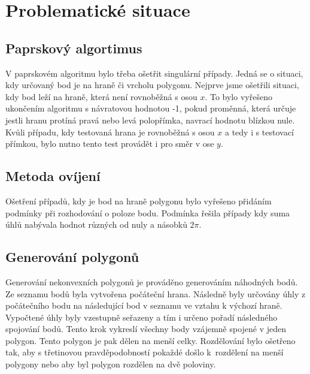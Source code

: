 \documentclass{article}
\begin{document}

\section{Problematické situace}
\subsection{Paprskový algortimus}
V paprskovém algoritmu bylo třeba ošetřit singulární případy. Jedná se o situaci, kdy určovaný bod je na hraně či vrcholu polygonu. Nejprve jsme ošetřili situaci, kdy bod leží na hraně, která není rovnoběžná s osou $x$. To bylo vyřešeno ukončením algoritmu s návratovou hodnotou -1, pokud proměnná, která určuje jestli hranu protíná pravá nebo levá polopřímka, navrací hodnotu blízkou nule. Kvůli případu, kdy testovaná hrana je rovnoběžná s osou $x$ a tedy i s testovací přímkou, bylo nutno tento test provádět i pro směr v ose $y$.

\subsection{Metoda ovíjení}
\label{ref:draw}
Ošetření případů, kdy je bod na hraně polygonu bylo vyřešeno přidáním podmínky při rozhodování o poloze bodu. Podmínka řešila případy kdy suma úhlů nabývala hodnot různých od nuly a násobků $2\pi$.

\subsection{Generování polygonů}
Generování nekonvexních polygonů je prováděno generováním náhodných bodů. Ze seznamu bodů byla vytvořena počáteční hrana. Následně byly určovány úhly z počátečního bodu na následující bod v seznamu ve vztahu k výchozí hraně. Vypočtené úhly byly vzestupně seřazeny a tím i určeno pořadí následného spojování bodů. Tento krok vykreslí všechny body vzájemně spojené v jeden polygon. Tento polygon je pak dělen na menší celky. Rozdělování bylo ošetřeno tak, aby s třetinovou pravděpodobností pokaždé došlo k~rozdělení na menší polygony nebo aby byl polygon rozdělen na dvě poloviny.
\end{document}
